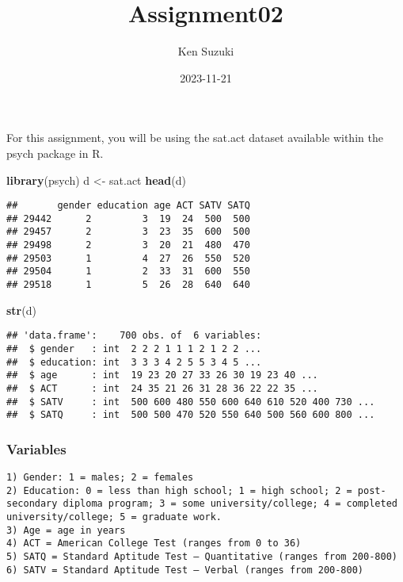 \documentclass[
]{article}
\title{Assignment02}
\author{Ken Suzuki}
\date{2023-11-21}
\newenvironment{Shaded}{\begin{snugshade}}{\end{snugshade}}
\newcommand{\FunctionTok}[1]{\textcolor[rgb]{0.13,0.29,0.53}{\textbf{#1}}}
\newcommand{\NormalTok}[1]{#1}
\newcommand{\OtherTok}[1]{\textcolor[rgb]{0.56,0.35,0.01}{#1}}
\begin{document}
\maketitle

For this assignment, you will be using the sat.act dataset available
within the psych package in R.

\begin{Shaded}
\begin{Highlighting}[]
\FunctionTok{library}\NormalTok{(psych)}
\NormalTok{d }\OtherTok{\textless{}{-}}\NormalTok{ sat.act }
\FunctionTok{head}\NormalTok{(d)}
\end{Highlighting}
\end{Shaded}

\begin{verbatim}
##       gender education age ACT SATV SATQ
## 29442      2         3  19  24  500  500
## 29457      2         3  23  35  600  500
## 29498      2         3  20  21  480  470
## 29503      1         4  27  26  550  520
## 29504      1         2  33  31  600  550
## 29518      1         5  26  28  640  640
\end{verbatim}

\begin{Shaded}
\begin{Highlighting}[]
\FunctionTok{str}\NormalTok{(d)}
\end{Highlighting}
\end{Shaded}

\begin{verbatim}
## 'data.frame':    700 obs. of  6 variables:
##  $ gender   : int  2 2 2 1 1 1 2 1 2 2 ...
##  $ education: int  3 3 3 4 2 5 5 3 4 5 ...
##  $ age      : int  19 23 20 27 33 26 30 19 23 40 ...
##  $ ACT      : int  24 35 21 26 31 28 36 22 22 35 ...
##  $ SATV     : int  500 600 480 550 600 640 610 520 400 730 ...
##  $ SATQ     : int  500 500 470 520 550 640 500 560 600 800 ...
\end{verbatim}

\hypertarget{variables}{%
\subsubsection{Variables}\label{variables}}

\begin{verbatim}
1) Gender: 1 = males; 2 = females
2) Education: 0 = less than high school; 1 = high school; 2 = post-secondary diploma program; 3 = some university/college; 4 = completed university/college; 5 = graduate work.
3) Age = age in years
4) ACT = American College Test (ranges from 0 to 36)
5) SATQ = Standard Aptitude Test – Quantitative (ranges from 200-800)
6) SATV = Standard Aptitude Test – Verbal (ranges from 200-800)
\end{verbatim}
\end{document}
